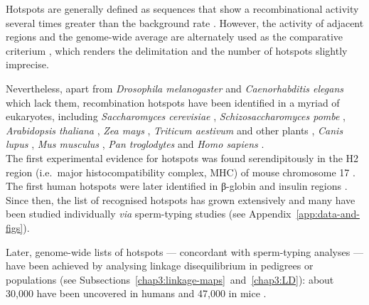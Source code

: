 Hotspots are generally defined as sequences that show a recombinational activity several times greater than the background rate \citep{crawford2004evidence,stapley2017variation}. 
However, the activity of adjacent regions and the genome-wide average are alternately used as the comparative criterium \citep{demassy2013initiation}, which renders the delimitation and the number of hotspots slightly imprecise.

Nevertheless, apart from \textit{Drosophila melanogaster} \citep{comeron2012many,manzano-winkler2013how} and \textit{Caenorhabditis elegans} \citep{kaur2014crossover} which lack them, recombination hotspots have been identified in a myriad of eukaryotes, including \textit{Saccharomyces cerevisiae} \citep{sun1989doublestrand,lichten1995meiotic}, \textit{Schizosaccharomyces pombe} \citep{steiner2005natural,cromie2007discrete}, \textit{Arabidopsis thaliana} \citep{drouaud2006variation}, \textit{Zea mays} \citep{brown1991recombination,dooner1997recombination,yao2002molecular,fu2002recombination}, \textit{Triticum aestivum} \citep{saintenac2011variation} and other plants \citep{mezard2006meiotic}, \textit{Canis lupus} \citep{axelsson2012death}, \textit{Mus musculus} \citep{guillon2002initiation,kauppi2007meiotic,smagulova2011genomewide}, \textit{Pan troglodytes} \citep{winckler2005comparison,auton2012finescale} and \textit{Homo sapiens} \citep{jeffreys2001intensely,myers2005finescale}.\\



The first experimental evidence for hotspots was found serendipitously in the H2 region (i.e.\ major histocompatibility complex, MHC) of mouse chromosome 17 \citep{steinmetz1982molecular}.
The first human hotspots were later identified in \textgreek{β}-globin and insulin regions \citep{chakravarti1984nonuniform,chakravarti1986evidence}. 
Since then, the list of recognised hotspots has grown extensively \citep[reviewed in][]{arnheim2007mammalian,paigen2010mammalian} and many have been studied individually \textit{via} sperm-typing studies \citep[e.g.\ ][]{hubert1994high,jeffreys2001intensely,schneider2002direct} (see Appendix~\ref{app:data-and-figs}).

Later, genome-wide lists of hotspots — concordant with sperm-typing analyses \citep[e.g.][]{tiemann-boege2006highresolution} — have been achieved by analysing linkage disequilibrium in pedigrees or populations (see Subsections~\ref{chap3:linkage-maps}~and~\ref{chap3:LD}): about 30,000 have been uncovered in humans \citep{myers2005finescale,theinternationalhapmapconsortium2007seconda} and 47,000 in mice \citep{brunschwig2012finescale}.\\


